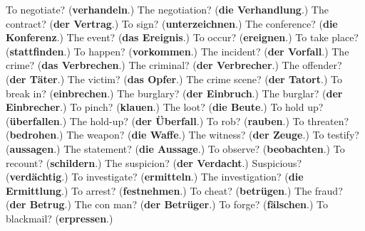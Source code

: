 \begin{tcolorbox}[breakable,colback=teal!4,colframe=teal!35!black,title={Before you move on}]
To negotiate? (\textbf{verhandeln}.) The negotiation? (\textbf{die Verhandlung}.) The contract? (\textbf{der Vertrag}.) To sign? (\textbf{unterzeichnen}.) The conference? (\textbf{die Konferenz}.) The event? (\textbf{das Ereignis}.) To occur? (\textbf{ereignen}.) To take place? (\textbf{stattfinden}.) To happen? (\textbf{vorkommen}.) The incident? (\textbf{der Vorfall}.) The crime? (\textbf{das Verbrechen}.) The criminal? (\textbf{der Verbrecher}.) The offender? (\textbf{der Täter}.) The victim? (\textbf{das Opfer}.) The crime scene? (\textbf{der Tatort}.) To break in? (\textbf{einbrechen}.) The burglary? (\textbf{der Einbruch}.) The burglar? (\textbf{der Einbrecher}.) To pinch? (\textbf{klauen}.) The loot? (\textbf{die Beute}.) To hold up? (\textbf{überfallen}.) The hold-up? (\textbf{der Überfall}.) To rob? (\textbf{rauben}.) To threaten? (\textbf{bedrohen}.) The weapon? (\textbf{die Waffe}.) The witness? (\textbf{der Zeuge}.) To testify? (\textbf{aussagen}.) The statement? (\textbf{die Aussage}.) To observe? (\textbf{beobachten}.) To recount? (\textbf{schildern}.) The suspicion? (\textbf{der Verdacht}.) Suspicious? (\textbf{verdächtig}.) To investigate? (\textbf{ermitteln}.) The investigation? (\textbf{die Ermittlung}.) To arrest? (\textbf{festnehmen}.) To cheat? (\textbf{betrügen}.) The fraud? (\textbf{der Betrug}.) The con man? (\textbf{der Betrüger}.) To forge? (\textbf{fälschen}.) To blackmail? (\textbf{erpressen}.)
\end{tcolorbox}
